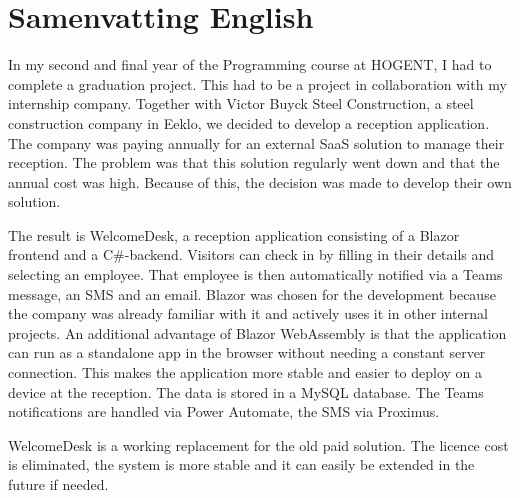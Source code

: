 
\chapter*{Samenvatting English}

In my second and final year of the Programming course at HOGENT, 
I had to complete a graduation project. This had to be a project in 
collaboration with my internship company. Together with Victor Buyck 
Steel Construction, a steel construction company in Eeklo, we decided 
to develop a reception application.
\bigskip
The company was paying annually for an external SaaS solution to manage 
their reception. The problem was that this solution regularly went down 
and that the annual cost was high. Because of this, the decision was made 
to develop their own solution.

\bigskip
The result is WelcomeDesk, a reception application consisting of a 
Blazor frontend and a C\#-backend. Visitors can check in by filling in 
their details and selecting an employee. That employee is then automatically 
notified via a Teams message, an SMS and an email.
\bigskip
Blazor was chosen for the development because the company was already 
familiar with it and actively uses it in other internal projects. An 
additional advantage of Blazor WebAssembly is that the application can 
run as a standalone app in the browser without needing a constant server 
connection. This makes the application more stable and easier to deploy 
on a device at the reception. The data is stored in a MySQL database. 
The Teams notifications are handled via Power Automate, the SMS via Proximus.

\bigskip
WelcomeDesk is a working replacement for the old paid solution. 
The licence cost is eliminated, the system is more stable and it can 
easily be extended in the future if needed.
